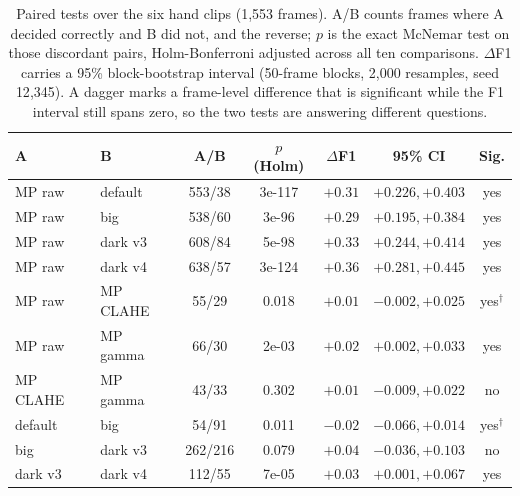 \documentclass[conference,a4paper]{IEEEtran}
\begin{document}
\begin{table}[t]
\caption{Paired tests over the six hand clips (1,553 frames). A/B counts
frames where A decided correctly and B did not, and the reverse; $p$ is the
exact McNemar test on those discordant pairs, Holm-Bonferroni adjusted
across all ten comparisons. $\Delta$F1 carries a 95\% block-bootstrap
interval (50-frame blocks, 2{,}000 resamples, seed 12{,}345). A dagger
marks a frame-level difference that is significant while the F1 interval
still spans zero, so the two tests are answering different questions.}
\label{tab:stats}
\centering
\scriptsize
\setlength{\tabcolsep}{3pt}
\begin{tabular}{@{}llccccc@{}}
\toprule
A & B & A/B & $p$ (Holm) & $\Delta$F1 & 95\% CI & Sig. \\
\midrule
MP raw & default & 553/38 & 3e-117 & $+0.31$ & $+0.226,+0.403$ & yes \\
MP raw & big & 538/60 & 3e-96 & $+0.29$ & $+0.195,+0.384$ & yes \\
MP raw & dark v3 & 608/84 & 5e-98 & $+0.33$ & $+0.244,+0.414$ & yes \\
MP raw & dark v4 & 638/57 & 3e-124 & $+0.36$ & $+0.281,+0.445$ & yes \\
MP raw & MP CLAHE & 55/29 & 0.018 & $+0.01$ & $-0.002,+0.025$ & yes$^{\dagger}$ \\
MP raw & MP gamma & 66/30 & 2e-03 & $+0.02$ & $+0.002,+0.033$ & yes \\
MP CLAHE & MP gamma & 43/33 & 0.302 & $+0.01$ & $-0.009,+0.022$ & no \\
default & big & 54/91 & 0.011 & $-0.02$ & $-0.066,+0.014$ & yes$^{\dagger}$ \\
big & dark v3 & 262/216 & 0.079 & $+0.04$ & $-0.036,+0.103$ & no \\
dark v3 & dark v4 & 112/55 & 7e-05 & $+0.03$ & $+0.001,+0.067$ & yes \\
\bottomrule
\end{tabular}
\end{table}
\end{document}
